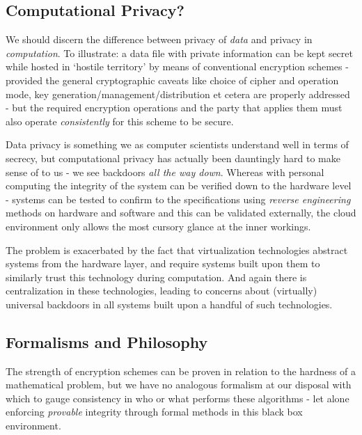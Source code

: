 \documentclass[11pt, a4paper]{article}
\begin{document}
\subsection{Computational Privacy?}
We should discern the difference between privacy of \textit{data} and privacy in \textit{computation}.
To illustrate: a data file with private information can be kept secret while hosted in `hostile territory' by means of conventional encryption schemes - provided the general cryptographic caveats like choice of cipher and operation mode, key generation/management/distribution et cetera are properly addressed - but the required encryption operations and the party that applies them must also operate \textit{consistently} for this scheme to be secure.

Data privacy is something we as computer scientists understand well in terms of secrecy, but computational privacy has actually been dauntingly hard to make sense of to us - we see backdoors \emph{all the way down}.
Whereas with personal computing the integrity of the system can be verified down to the hardware level - systems can be tested to confirm to the specifications using \textit{reverse engineering} methods on hardware and software and this can be validated externally, the cloud environment only allows the most cursory glance at the inner workings.

The problem is exacerbated by the fact that virtualization technologies abstract systems from the hardware layer, and require systems built upon them to similarly trust this technology during computation.
And again there is centralization in these technologies, leading to concerns about (virtually) universal backdoors in all systems built upon a handful of such technologies.

\subsection{Formalisms and Philosophy}
The strength of encryption schemes can be proven in relation to the hardness of a mathematical problem, but we have no analogous formalism at our disposal with which to gauge consistency in who or what performs these algorithms - let alone enforcing \textit{provable} integrity through formal methods in this black box environment.
\end{document}
